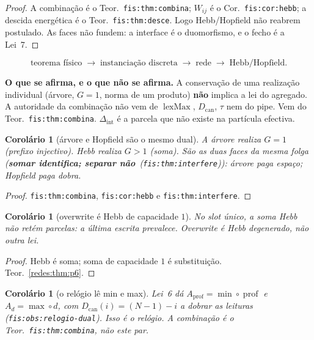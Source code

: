\documentclass[11pt,a4paper]{article}
\newcommand{\code}[1]{\texttt{\small #1}}
\newcommand{\fis}[2]{\textbf{#2}~\textnormal{(\code{#1})}}
\newtheorem{corolario}[teorema]{Corolário}
\begin{document}
\begin{proof}
A combinação é o Teor.~\code{fis:thm:combina}; $W_{ij}$ é o
Cor.~\code{fis:cor:hebb}; a descida energética é o Teor.~\code{fis:thm:desce}.
Logo Hebb/Hopfield não reabrem postulado. As faces não fundem: a interface é o
duomorfismo, e o fecho é a Lei~7.
\end{proof}

\[
\text{teorema físico}
\;\longrightarrow\;
\text{instanciação discreta}
\;\longrightarrow\;
\text{rede}
\;\longrightarrow\;
\text{Hebb/Hopfield}.
\]

\medskip\noindent\textbf{O que se afirma, e o que não se afirma.}
A conservação de uma realização individual (árvore, $G=1$, norma de um produto)
\textbf{não} implica a lei do agregado. A autoridade da combinação não vem de
$\operatorname{lexMax}$, $D_{\mathrm{can}}$, $\tau$ nem do pipe. Vem do
Teor.~\code{fis:thm:combina}. $\Delta_{\mathrm{int}}$ é a parcela que não
existe na partícula efectiva.

\begin{corolario}[árvore e Hopfield são o mesmo dual]\label{redes:cor:dual-gh}
A árvore realiza $G=1$ (prefixo injectivo). Hebb realiza $G>1$ (soma).
São as duas faces da mesma folga
(\fis{fis:thm:interfere}{somar identifica; separar não}):
árvore paga espaço; Hopfield paga dobra.
\end{corolario}

\begin{proof}
\code{fis:thm:combina}, \code{fis:cor:hebb} e \code{fis:thm:interfere}.
\end{proof}

\begin{corolario}[overwrite é Hebb de capacidade $1$]\label{redes:cor:ow}
No slot único, a soma Hebb não retém parcelas: a última escrita prevalece.
Overwrite é Hebb degenerado, não outra lei.
\end{corolario}

\begin{proof}
Hebb é soma; soma de capacidade $1$ é substituição. Teor.~\ref{redes:thm:p6}.
\end{proof}

\begin{corolario}[o relógio lê min e max]\label{redes:cor:relogio}
Lei~6 dá
$A_{\mathrm{prof}}=\min\circ\operatorname{prof}$ e $A_d=\max\circ d$,
com $D_{\mathrm{can}}(i)=(N-1)-i$ a dobrar as leituras
(\code{fis:obs:relogio-dual}). Isso é o relógio. A combinação é o
Teor.~\code{fis:thm:combina}, não este par.
\end{corolario}
\end{document}
